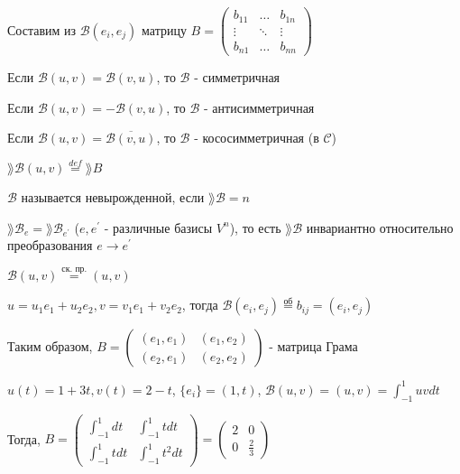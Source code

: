 \documentclass[12pt]{article}
\begin{document}
    \Nota Составим из $\mathcal{B}(e_i, e_j)$ матрицу $B = \begin{pmatrix}b_{11} & \dots & b_{1n} \\ \vdots & \ddots & \vdots \\ b_{n1} & \dots & b_{nn}\end{pmatrix}$

     Если $\mathcal{B}(u, v) = \mathcal{B}(v, u)$, то $\mathcal{B}$ - симметричная

     Если $\mathcal{B}(u, v) = -\mathcal{B}(v, u)$, то $\mathcal{B}$ - антисимметричная

     Если $\mathcal{B}(u, v) = \overline{\mathcal{B}(v, u)}$, то $\mathcal{B}$ - кососимметричная (в $\mathcal{C}$)

    \Def $\rang \mathcal{B}(u, v) \stackrel{def}{=} \rang B$

     $\mathcal{B}$ называется невырожденной, если $\rang \mathcal{B} = n$

     $\rang \mathcal{B}_e = \rang \mathcal{B}_{e^\prime} $ ($e, e^\prime$ - различные базисы $V^n$), то есть $\rang \mathcal{B}$ инвариантно относительно преобразования $e \to e^\prime$

    \Ex $\mathcal{B}(u, v) \stackrel{\text{ск. пр.}}{=} (u, v)$

    $u = u_1 e_1 + u_2 e_2, v = v_1 e_1 + v_2 e_2$, тогда $\mathcal{B}(e_i, e_j) \stackrel{\text{об}}{=} b_{ij} = (e_i, e_j)$

    Таким образом, $B = \begin{pmatrix}(e_1, e_1) & (e_1, e_2) \\ (e_2, e_1) & (e_2, e_2)\end{pmatrix}$ - матрица Грама

    \Ex $u(t) = 1 + 3t, v(t) = 2 - t$, $\{e_i\} = (1, t)$, $\mathcal{B}(u, v) = (u, v) = \int_{-1}^1 uv dt$

    Тогда, $B = \begin{pmatrix}\int_{-1}^1 dt & \int_{-1}^1 t dt \\ \int_{-1}^1 t dt & \int_{-1}^1 t^2 dt\end{pmatrix} = \begin{pmatrix}2 & 0 \\ 0 & \frac{2}{3}\end{pmatrix}$
\end{document}

